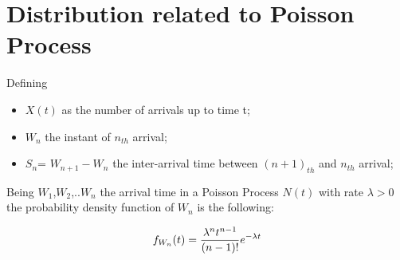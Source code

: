 \section{Distribution related to Poisson Process}
Defining
\begin{itemize}
	\item $X(t)$ as the number of arrivals up to time t;
	\item $W_n$ the instant of $n_{th}$ arrival;
	\item $S_n$= $W_{n+1} - W_n$ the inter-arrival time between $(n+1)_{th}$ and $n_{th}$ arrival;
\end{itemize}

\begin{theorem}
	Being $W_{1}$,$W_{2}$,..$W_{n}$ the arrival time in a Poisson Process $N(t)$ with rate ${\lambda}>0$ the probability density function of $W_n$ is the following:

	\begin{equation}
	f_{W_n} (t )=\frac{\lambda^n t^{n-1}} {(n-1)!}e^{-\lambda t} \\
	\end{equation}
\end{theorem}

